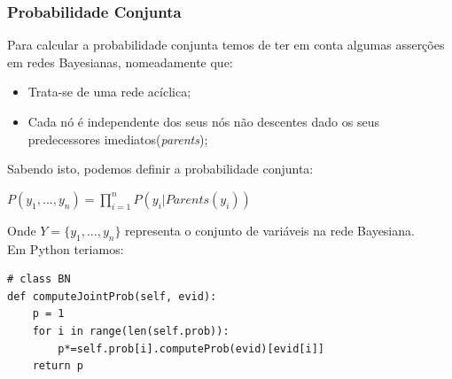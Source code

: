 \documentclass[9pt, a4paper, twocolumn]{article}
\begin{document}
\subsubsection{Probabilidade Conjunta}
\hspace{10mm}Para calcular a probabilidade conjunta temos de ter em conta algumas asserções em redes Bayesianas, nomeadamente que:
\begin{itemize}
\item Trata-se de uma rede acíclica; 
\item Cada nó é independente dos seus nós não descentes dado os seus predecessores imediatos(\textit{parents});
\end{itemize}
Sabendo isto, podemos definir a probabilidade conjunta:
\begin{center}
$P(y_{1},...,y_{n}) = \displaystyle\prod_{i=1}^{n}P(y_{i}|Parents(y_{i}))$ 
\end{center}
Onde $Y = \{y_{1},..., y_{n}\}$ representa o conjunto de variáveis na rede Bayesiana.\\
Em Python teriamos:
\begin{lstlisting}
# class BN
def computeJointProb(self, evid):
	p = 1
	for i in range(len(self.prob)):
		p*=self.prob[i].computeProb(evid)[evid[i]]
	return p
\end{lstlisting}
\end{document}
